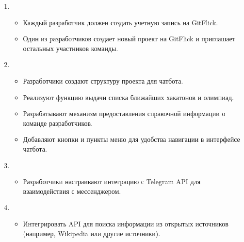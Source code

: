 \documentclass[letterpaper,10pt,russian]{sphinxmanual}
\begin{document}
\sphinxAtStartPar
{}
\begin{enumerate}
%
\item {} 
\sphinxAtStartPar
{}
\begin{itemize}
\item {} 
\sphinxAtStartPar
Каждый разработчик должен создать учетную запись на GitFlick.

\item {} 
\sphinxAtStartPar
Один из разработчиков создает новый проект на GitFlick и приглашает остальных участников команды.

\end{itemize}

\item {} 
\sphinxAtStartPar
{}
\begin{itemize}
\item {} 
\sphinxAtStartPar
Разработчики создают структуру проекта для чат\sphinxhyphen{}бота.

\item {} 
\sphinxAtStartPar
Реализуют функцию выдачи списка ближайших хакатонов и олимпиад.

\item {} 
\sphinxAtStartPar
Разрабатывают механизм предоставления справочной информации о команде разработчиков.

\item {} 
\sphinxAtStartPar
Добавляют кнопки и пункты меню для удобства навигации в интерфейсе чат\sphinxhyphen{}бота.

\end{itemize}

\item {} 
\sphinxAtStartPar
{}
\begin{itemize}
\item {} 
\sphinxAtStartPar
Разработчики настраивают интеграцию с Telegram API для взаимодействия с мессенджером.

\end{itemize}

\item {} 
\sphinxAtStartPar
{}
\begin{itemize}
\item {} 
\sphinxAtStartPar
Интегрировать API для поиска информации из открытых источников (например, Wikipedia или другие источники).


\end{itemize}
\end{enumerate}
\end{document}
